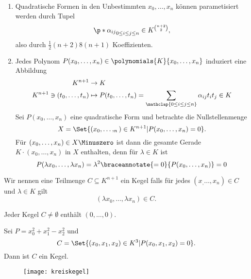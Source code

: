 \begin{bemerkungen*}
  \begin{enumerate}
    \item Quadratische Formen in den Unbestimmten \( x_0,\dotsc,x_n \) können parametisiert werden durch Tupel
    \begin{equation*}
      \p*{\alpha_{ij}}_{0\leq i\leq j\leq n}\in K^{\binom{n+2}{2}},
    \end{equation*}
    also durch \( \frac{1}{2}(n+2)8(n+1) \) Koeffizienten.
    \item Jedes Polynom \( P(x_0,\dotsc,x_n)\in \polynomials{K}{x_0,\dotsc,x_n} \) induziert eine Abbildung
    \begin{align}
      K^{n+1}&\to K\\
      K^{n+1}\ni(t_0,\dotsc,t_n) &\mapsto P(t_0,\dots,t_n)=\sum_{\mathclap{0\leq i\leq j\leq n}}\alpha_{ij}t_i t_j\in K
    \end{align}
    Sei \( P(x_0,\dotsc,x_n) \) eine quadratische Form und betrachte die Nullstellenmenge
    \begin{equation*}
      X=\Set{(x_0,\dotsc,_n)\in K^{n+1}|P(x_0,\dotsc,x_n)=0}.
    \end{equation*}
    Für \( (x_0,\dotsc,x_n)\in X\Minuszero \) ist dann die gesamte Gerade \( K\cdot(x_0,\dotsc,x_n) \) in \( X \) enthalten, denn für \( \lambda\in K \) ist 
    \begin{equation*}
      P(\lambda x_0,\dotsc,\lambda x_n)=\lambda^2 \braceannotate{=0}{P(x_0,\dotsc,x_n)}=0
    \end{equation*}
  \end{enumerate}
\end{bemerkungen*}
\begin{definition*}
  Wir nennen eine Teilmenge \( C\subseteq K^{n+1} \) ein Kegel falls für jedes \( (x_,\dotsc,x_n)\in C \) und \( \lambda\in K \) gilt
  \begin{equation*}
    (\lambda x_0,\dotsc,\lambda x_n)\in C.
  \end{equation*}
\end{definition*}
\begin{bemerkung*}
  Jeder Kegel \( C\neq \emptyset \) enthält \( (0,\dotsc,0) \).
\end{bemerkung*}
\begin{beispiel}
  Sei \( P=x_0^2+x_1^2-x_2^2 \) und
  \begin{equation*}
    C=\Set{(x_0,x_1,x_2)\in K^3|P(x_0,x_1,x_2)=0}.
  \end{equation*}
  Dann ist \( C \) ein Kegel.
  \begin{figure}[H]
    \centering
    \texttt{[image: kreiskegel]}
    \label{fig:kreiskegel}
  \end{figure}
  
\end{beispiel}
